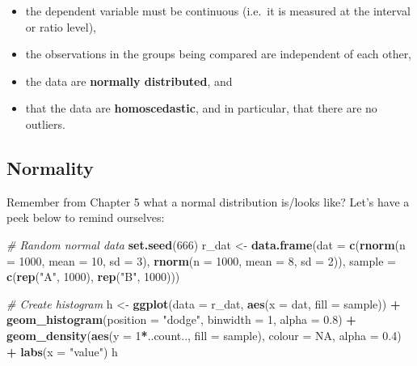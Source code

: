 \documentclass[english,10pt,a4paper,oneside]{book}
\providecommand{\tightlist}{%
  \setlength{\itemsep}{0pt}\setlength{\parskip}{0pt}}
\newenvironment{Shaded}{\begin{snugshade}}{\end{snugshade}}
\newcommand{\KeywordTok}[1]{\textcolor[rgb]{0.13,0.29,0.53}{\textbf{#1}}}
\newcommand{\DataTypeTok}[1]{\textcolor[rgb]{0.13,0.29,0.53}{#1}}
\newcommand{\DecValTok}[1]{\textcolor[rgb]{0.00,0.00,0.81}{#1}}
\newcommand{\FloatTok}[1]{\textcolor[rgb]{0.00,0.00,0.81}{#1}}
\newcommand{\StringTok}[1]{\textcolor[rgb]{0.31,0.60,0.02}{#1}}
\newcommand{\CommentTok}[1]{\textcolor[rgb]{0.56,0.35,0.01}{\textit{#1}}}
\newcommand{\OtherTok}[1]{\textcolor[rgb]{0.56,0.35,0.01}{#1}}
\newcommand{\OperatorTok}[1]{\textcolor[rgb]{0.81,0.36,0.00}{\textbf{#1}}}
\newcommand{\NormalTok}[1]{#1}
\theoremstyle{definition}
\theoremstyle{definition}
\theoremstyle{definition}
\theoremstyle{remark}
\begin{document}
\begin{itemize}
\tightlist
\item
  the dependent variable must be continuous (i.e.~it is measured at the
  interval or ratio level),
\item
  the observations in the groups being compared are independent of each
  other,
\item
  the data are \textbf{normally distributed}, and
\item
  that the data are \textbf{homoscedastic}, and in particular, that
  there are no outliers.
\end{itemize}

\subsection{Normality}\label{normality}

Remember from Chapter 5 what a normal distribution is/looks like? Let's
have a peek below to remind ourselves:

\begin{Shaded}
\begin{Highlighting}[]
\CommentTok{# Random normal data}
\KeywordTok{set.seed}\NormalTok{(}\DecValTok{666}\NormalTok{)}
\NormalTok{r_dat <-}\StringTok{ }\KeywordTok{data.frame}\NormalTok{(}\DataTypeTok{dat =} \KeywordTok{c}\NormalTok{(}\KeywordTok{rnorm}\NormalTok{(}\DataTypeTok{n =} \DecValTok{1000}\NormalTok{, }\DataTypeTok{mean =} \DecValTok{10}\NormalTok{, }\DataTypeTok{sd =} \DecValTok{3}\NormalTok{),}
                            \KeywordTok{rnorm}\NormalTok{(}\DataTypeTok{n =} \DecValTok{1000}\NormalTok{, }\DataTypeTok{mean =} \DecValTok{8}\NormalTok{, }\DataTypeTok{sd =} \DecValTok{2}\NormalTok{)),}
                    \DataTypeTok{sample =} \KeywordTok{c}\NormalTok{(}\KeywordTok{rep}\NormalTok{(}\StringTok{"A"}\NormalTok{, }\DecValTok{1000}\NormalTok{), }\KeywordTok{rep}\NormalTok{(}\StringTok{"B"}\NormalTok{, }\DecValTok{1000}\NormalTok{)))}

\CommentTok{# Create histogram}
\NormalTok{h <-}\StringTok{ }\KeywordTok{ggplot}\NormalTok{(}\DataTypeTok{data =}\NormalTok{ r_dat, }\KeywordTok{aes}\NormalTok{(}\DataTypeTok{x =}\NormalTok{ dat, }\DataTypeTok{fill =}\NormalTok{ sample)) }\OperatorTok{+}
\StringTok{  }\KeywordTok{geom_histogram}\NormalTok{(}\DataTypeTok{position =} \StringTok{"dodge"}\NormalTok{, }\DataTypeTok{binwidth =} \DecValTok{1}\NormalTok{, }\DataTypeTok{alpha =} \FloatTok{0.8}\NormalTok{) }\OperatorTok{+}
\StringTok{  }\KeywordTok{geom_density}\NormalTok{(}\KeywordTok{aes}\NormalTok{(}\DataTypeTok{y =} \DecValTok{1}\OperatorTok{*}\NormalTok{..count.., }\DataTypeTok{fill =}\NormalTok{ sample), }\DataTypeTok{colour =} \OtherTok{NA}\NormalTok{, }\DataTypeTok{alpha =} \FloatTok{0.4}\NormalTok{) }\OperatorTok{+}
\StringTok{  }\KeywordTok{labs}\NormalTok{(}\DataTypeTok{x =} \StringTok{"value"}\NormalTok{)}
\NormalTok{h}
\end{Highlighting}
\end{Shaded}
\end{document}
